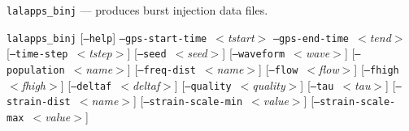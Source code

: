 \documentclass{article}
\newcommand{\prog}[1]{\texttt{#1}}
\newcommand{\option}[1]{\texttt{#1}}
\newcommand{\parm}[1]{$<$\textit{#1}$>$}
\newenvironment{entry}%
  {\begin{list}{}{\renewcommand{\makelabel}[1]%
    {\parbox[b]{\labelwidth}{\makebox[0pt][l]{\textbf{##1}}\\}}%
    \setlength{\labelwidth}{1em}%
    \setlength{\labelsep}{1em}%
    \setlength{\leftmargin}{2em}%
    \setlength{\topsep}{\medskipamount}%
    \setlength{\itemsep}{\medskipamount}%
    \setlength{\parsep}{\medskipamount}%
    \setlength{\listparindent}{0pt}}}
  {\end{list}}
\begin{document}
\begin{entry}
\item[Name]
\prog{lalapps\_binj} --- produces burst injection data files.

\item[Synopsis]
\prog{lalapps\_binj} \newline \hspace*{0.5in}
[\option{--help}] \newline \hspace*{0.5in}
\option{--gps-start-time}~\parm{tstart} \newline \hspace*{0.5in}
\option{--gps-end-time}~\parm{tend} \newline \hspace*{0.5in}
[\option{--time-step}~\parm{tstep}] \newline \hspace*{0.5in}
[\option{--seed}~\parm{seed}] \newline \hspace*{0.5in}
[\option{--waveform}~\parm{wave}] \newline \hspace*{0.5in}
[\option{--population}~\parm{name}] \newline \hspace*{0.5in}
[\option{--freq-dist}~\parm{name}] \newline \hspace*{0.5in}
[\option{--flow}~\parm{flow}] \newline \hspace*{0.5in}
[\option{--fhigh}~\parm{fhigh}] \newline \hspace*{0.5in}
[\option{--deltaf}~\parm{deltaf}] \newline \hspace*{0.5in}
[\option{--quality}~\parm{quality}] \newline \hspace*{0.5in}
[\option{--tau}~\parm{tau}] \newline \hspace*{0.5in}
[\option{--strain-dist}~\parm{name}] \newline \hspace*{0.5in}
[\option{--strain-scale-min}~\parm{value}] \newline \hspace*{0.5in}
[\option{--strain-scale-max}~\parm{value}] \newline \hspace*{0.5in}

\end{entry}
\end{document}
